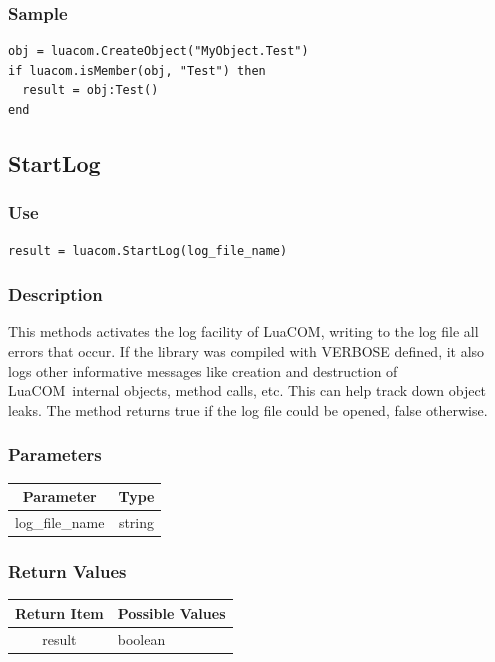\documentclass[11pt,a4paper,english]{report}
\newcommand{\ttext}[1]{#1}
\newcommand{\ttext}[1]{{\raggedright #1 \\}}
\newcommand{\techname}[1]{\mbox{#1}}
\newcommand{\luacom}{\techname{LuaCOM}}
\begin{document}
\subsubsection*{Sample}

\begin{verbatim}
obj = luacom.CreateObject("MyObject.Test")
if luacom.isMember(obj, "Test") then
  result = obj:Test()
end
\end{verbatim}

\subsection*{StartLog}

\subsubsection*{Use}

\begin{verbatim}
result = luacom.StartLog(log_file_name)
\end{verbatim}

\subsubsection*{Description}
This methods activates the log facility of \luacom, writing to the log
file all errors that occur. If the library was compiled with VERBOSE
defined, it also logs other informative messages like creation and
destruction of \luacom\ internal objects, method calls, etc. This can
help track down object leaks. The method returns \ttext{true} if the
log file could be opened, \ttext{false} otherwise.


\subsubsection*{Parameters}

\begin{tabular}{|c|c|}
\hline
\bf Parameter & \bf Type  \\ \hline \hline
log\_file\_name & string  \\ \hline
\end{tabular}

\subsubsection*{Return Values}

\begin{tabular}{|c|p{4cm}|}
\hline
\bf Return Item & \bf Possible Values \\ \hline \hline
result  & boolean  \\ \hline
\end{tabular}
\end{document}
